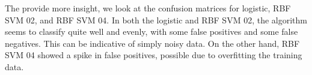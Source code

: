 \documentclass[10pt]{article}
\begin{document}
The provide more insight, we look at the confusion matrices for logistic, RBF SVM 02, and RBF SVM 04. In both the logistic and RBF SVM 02, the algorithm seems to classify quite well and evenly, with some false positives and some false negatives. This can be indicative of simply noisy data. On the other hand, RBF SVM 04 showed a spike in false positives, possible due to overfitting the training data.

%



%        


%        
%        
\end{document}
